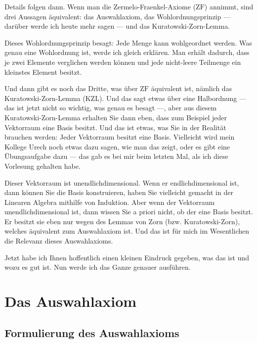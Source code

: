 \begin{spoken-clean}[00:09:45 - 00:12:15]
Details folgen dann. Wenn man die Zermelo-Fraenkel-Axiome ($\text{ZF}$) annimmt, sind drei Aussagen äquivalent: das Auswahlaxiom, das Wohlordnungsprinzip --- darüber werde ich heute mehr sagen --- und das Kuratowski-Zorn-Lemma.

Dieses Wohlordnungsprinzip besagt: Jede Menge kann wohlgeordnet werden. Was genau eine Wohlordnung ist, werde ich gleich erklären. Man erhält dadurch, dass je zwei Elemente verglichen werden können und jede nicht-leere Teilmenge ein kleinstes Element besitzt.

Und dann gibt es noch das Dritte, was über $\text{ZF}$ äquivalent ist, nämlich das Kuratowski-Zorn-Lemma ($\text{KZL}$). Und das sagt etwas über eine Halbordnung --- das ist jetzt nicht so wichtig, was genau es besagt ---, aber aus diesem Kuratowski-Zorn-Lemma erhalten Sie dann eben, dass zum Beispiel jeder Vektorraum eine Basis besitzt. Und das ist etwas, was Sie in der Realität brauchen werden: Jeder Vektorraum besitzt eine Basis. Vielleicht wird mein Kollege Urech noch etwas dazu sagen, wie man das zeigt, oder es gibt eine Übungsaufgabe dazu --- das gab es bei mir beim letzten Mal, als ich diese Vorlesung gehalten habe.

Dieser Vektorraum ist unendlichdimensional. Wenn er endlichdimensional ist, dann können Sie die Basis konstruieren, haben Sie vielleicht gemacht in der Linearen Algebra mithilfe von Induktion. Aber wenn der Vektorraum unendlichdimensional ist, dann wissen Sie a priori nicht, ob der eine Basis besitzt. Er besitzt sie eben nur wegen des Lemmas von Zorn (bzw. Kuratowski-Zorn), welches äquivalent zum Auswahlaxiom ist. Und das ist für mich im Wesentlichen die Relevanz dieses Auswahlaxioms.

Jetzt habe ich Ihnen hoffentlich einen kleinen Eindruck gegeben, was das ist und wozu es gut ist. Nun werde ich das Ganze genauer ausführen.
\end{spoken-clean}

\section{Das Auswahlaxiom}
\subsection{Formulierung des Auswahlaxioms}

